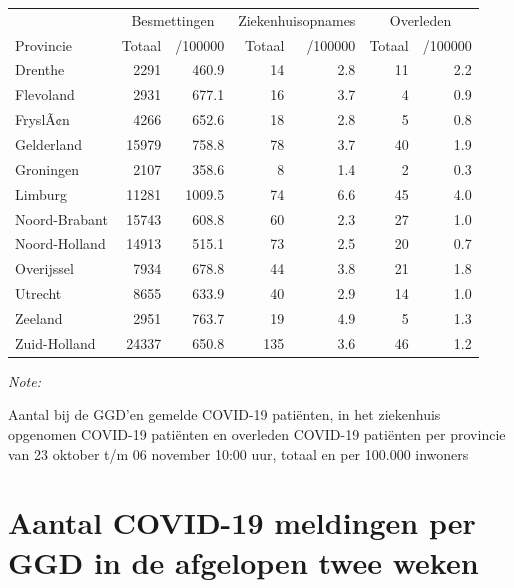 \documentclass[
  english,
  man,floatsintext]{apa6}
\begin{document}
\begin{table}
\centering
\begin{threeparttable}
\begin{tabular}{lrrrrrr}
\toprule
\multicolumn{1}{c}{ } & \multicolumn{2}{c}{Besmettingen} & \multicolumn{2}{c}{Ziekenhuisopnames} & \multicolumn{2}{c}{Overleden} \\
\cmidrule(l{3pt}r{3pt}){2-3} \cmidrule(l{3pt}r{3pt}){4-5} \cmidrule(l{3pt}r{3pt}){6-7}
Provincie & Totaal & /100000 & Totaal & /100000 & Totaal & /100000\\
\midrule
Drenthe & 2291 & 460.9 & 14 & 2.8 & 11 & 2.2\\
Flevoland & 2931 & 677.1 & 16 & 3.7 & 4 & 0.9\\
FryslÃ¢n & 4266 & 652.6 & 18 & 2.8 & 5 & 0.8\\
Gelderland & 15979 & 758.8 & 78 & 3.7 & 40 & 1.9\\
Groningen & 2107 & 358.6 & 8 & 1.4 & 2 & 0.3\\
Limburg & 11281 & 1009.5 & 74 & 6.6 & 45 & 4.0\\
Noord-Brabant & 15743 & 608.8 & 60 & 2.3 & 27 & 1.0\\
Noord-Holland & 14913 & 515.1 & 73 & 2.5 & 20 & 0.7\\
Overijssel & 7934 & 678.8 & 44 & 3.8 & 21 & 1.8\\
Utrecht & 8655 & 633.9 & 40 & 2.9 & 14 & 1.0\\
Zeeland & 2951 & 763.7 & 19 & 4.9 & 5 & 1.3\\
Zuid-Holland & 24337 & 650.8 & 135 & 3.6 & 46 & 1.2\\
\bottomrule
\end{tabular}
\begin{tablenotes}
\item \textit{Note: } 
\item Aantal bij de GGD’en gemelde COVID-19 patiënten, in het ziekenhuis opgenomen COVID-19 patiënten en overleden COVID-19 patiënten per provincie van 23 oktober t/m 06 november 10:00 uur, totaal en per 100.000 inwoners
\end{tablenotes}
\end{threeparttable}
\end{table}

\newpage

\hypertarget{aantal-covid-19-meldingen-per-ggd-in-de-afgelopen-twee-weken}{%
\section{Aantal COVID-19 meldingen per GGD in de afgelopen twee weken}\label{aantal-covid-19-meldingen-per-ggd-in-de-afgelopen-twee-weken}}
\end{document}
